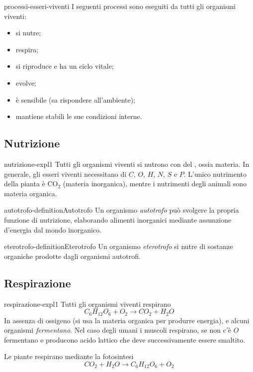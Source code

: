 \documentclass[preview]{standalone}
\begin{document}
\begin{snippet}{processi-esseri-viventi}
    I seguenti processi sono eseguiti da tutti gli organismi viventi:
    \begin{itemize}
        \item si nutre;
        \item respira;
        \item si riproduce e ha un ciclo vitale;
        \item evolve;
        \item è sensibile (sa rispondere all'ambiente);
        \item mantiene stabili le sue condizioni interne.
    \end{itemize}
\end{snippet}

\subsection{Nutrizione}

\begin{snippet}{nutrizione-expl1}
Tutti gli organismi viventi si nutrono con del , ossia materia.
In generale, gli esseri viventi necessitano di \(C\), \(O\), \(H\), \(N\), \(S\) e \(P\).
L'unico nutrimento della pianta è CO\({}_2\) (materia inorganica), mentre
i nutrimenti degli animali sono materia organica.
\end{snippet}

\begin{snippetdefinition}{autotrofo-definition}{Autotrofo}
    Un organismo \textit{autotrofo} può svolgere la propria funzione di nutrizione,
    elaborando alimenti inorganici mediante assunzione d'energia dal mondo inorganico.
\end{snippetdefinition}

\begin{snippetdefinition}{eterotrofo-definition}{Eterotrofo}
    Un organismo \textit{eterotrofo}
    si nutre di sostanze organiche prodotte dagli organismi autotrofi.
\end{snippetdefinition}

\subsection{Respirazione}

\begin{snippet}{respirazione-expl1}
Tutti gli organismi viventi respirano
\[
    C_6H_{12}O_6 + O_2 \rightarrow CO_2 + H_2O
\]
In assenza di ossigeno (si usa la materia organica per produrre energia), e alcuni organismi \textit{fermentano}.
Nel caso degli umani i muscoli respirano, se non c'è \(O\) fermentano e producono acido lattico
che deve successivamente essere smaltito.

Le piante respirano mediante la fotosintesi
\[
    CO_2 + H_2O \rightarrow C_6H_{12}O_6 + O_2
\]
\end{snippet}
\end{document}
